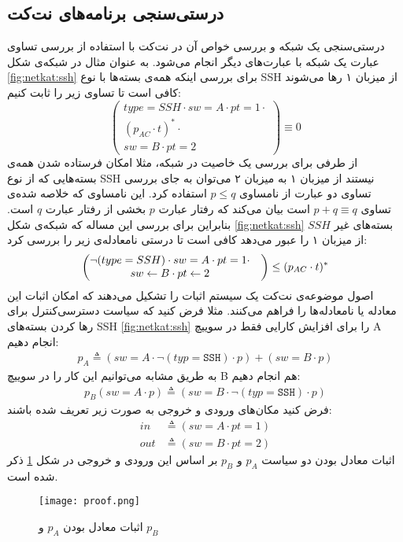 \subsection{درستی‌سنجی برنامه‌های نت‌کت}
درستی‌سنجی یک شبکه و بررسی خواص آن در نت‌کت با استفاده از بررسی تساوی عبارت یک شبکه با عبارت‌های دیگر انجام می‌شود.
به عنوان مثال در شبکه‌ی شکل
\ref{fig:netkat:ssh}
برای بررسی اینکه همه‌ی بسته‌ها با نوع
SSH
از میزبان ۱ رها می‌شوند کافی است تا تساوی زیر را ثابت کنیم:
\begin{equation*}
    \begin{pmatrix}
        type = SSH \cdot sw = A \cdot pt = 1 \cdot \\
        (p_{AC}\cdot t) ^ * \cdot                  \\
        sw = B\cdot pt = 2
    \end{pmatrix}
    \equiv 0
\end{equation*}
از طرفی برای بررسی یک خاصیت در شبکه، مثلا امکان فرستاده شدن‌ همه‌ی بسته‌هایی که از نوع
SSH
نیستند از میزبان ۱ به میزبان ۲
می‌توان به جای بررسی تساوی دو عبارت از نامساوی
$p \leq q$
استفاده کرد.
این نامساوی که خلاصه شده‌ی تساوی
$p + q \equiv q$
است بیان می‌کند که رفتار عبارت
$p$
بخشی از رفتار عبارت
$q$
است.
بنابراین برای بررسی این مساله که شبکه‌ی شکل
\ref{fig:netkat:ssh}
بسته‌های غیر
$SSH$
از میزبان ۱ را عبور می‌دهد کافی است تا درستی نامعادله‌ی زیر را بررسی کرد:
\begin{equation*}
    \begin{pmatrix}
        \neg(type = SSH) \cdot sw = A \cdot pt = 1 \cdot & \\
        sw \leftarrow B \cdot pt \leftarrow 2                          &
    \end{pmatrix}
    \leq (p_{AC}\cdot t)^ *
\end{equation*}
اصول موضوعه‌ی نت‌کت یک سیستم اثبات%
را تشکیل می‌دهند که امکان اثبات این معادله یا نامعادله‌ها را فراهم می‌کنند.
مثلا فرض کنید که سیاست دسترسی‌کنترل برای رها کردن بسته‌های
SSH
\ref{fig:netkat:ssh}
را برای افزایش کارایی فقط در سوییچ
A
انجام دهیم:
\begin{align*}
    p_A \triangleq (sw = A \cdot \neg(typ = \texttt{SSH})\cdot p)
    + (sw = B \cdot p)
\end{align*}
به طریق مشابه می‌توانیم این کار را در سوییچ
B
هم انجام دهیم:
\begin{align*}
    p_B (sw = A\cdot p) \triangleq (sw = B \cdot \neg(typ = \texttt{SSH})\cdot p)
\end{align*}
فرض کنید مکان‌های ورودی و خروجی به صورت زیر تعریف شده باشند:
\begin{align*}
    in  & \triangleq (sw = A \cdot pt = 1) \\
    out & \triangleq (sw = B \cdot pt = 2)
\end{align*}
اثبات معادل بودن دو سیاست
$p_A$
و
$p_B$
بر اساس این ورودی و خروجی در شکل
\ref{fig:netkat:proof}
ذکر شده است.

\begin{figure}
    \centering
    \texttt{[image: proof.png]}
    \caption{اثبات معادل بودن
        $p_A$
        و
        $p_B$
        \cite{netkat}
    }
    \label{fig:netkat:proof}
\end{figure}